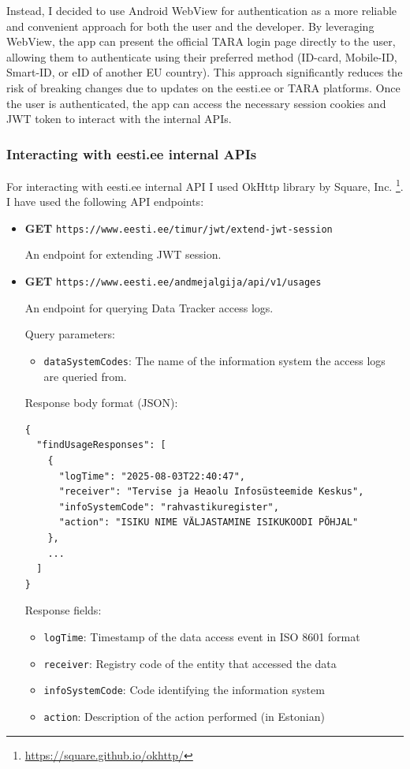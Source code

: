 Instead, I decided to use Android WebView for authentication as a more reliable and convenient approach for both the user and the developer. By leveraging WebView, the app can present the official TARA login page directly to the user, allowing them to authenticate using their preferred method (ID-card, Mobile-ID, Smart-ID, or eID of another EU country). This approach significantly reduces the risk of breaking changes due to updates on the eesti.ee or TARA platforms. Once the user is authenticated, the app can access the necessary session cookies and JWT token to interact with the internal APIs.

\subsubsection{Interacting with eesti.ee internal APIs}
For interacting with eesti.ee internal API I used OkHttp library by Square, Inc. \footnote{\url{https://square.github.io/okhttp/}}. I have used the following API endpoints:

\begin{itemize}
    \item \textbf{GET} \texttt{https://www.eesti.ee/timur/jwt/extend-jwt-session}
    
    An endpoint for extending JWT session.
    
    \item \textbf{GET} \texttt{https://www.eesti.ee/andmejalgija/api/v1/usages}
    
    An endpoint for querying Data Tracker access logs.
    
    Query parameters:
    \begin{itemize}
        \item \texttt{dataSystemCodes}: The name of the information system the access logs are queried from.
    \end{itemize}
    
    \samepage
    Response body format (JSON):
    \begin{small}
    \begin{verbatim}
{
  "findUsageResponses": [
    {
      "logTime": "2025-08-03T22:40:47",
      "receiver": "Tervise ja Heaolu Infosüsteemide Keskus",
      "infoSystemCode": "rahvastikuregister",
      "action": "ISIKU NIME VÄLJASTAMINE ISIKUKOODI PÕHJAL"
    },
    ...
  ]
}
    \end{verbatim}
    \end{small}
    
    Response fields:
    \begin{itemize}
        \item \texttt{logTime}: Timestamp of the data access event in ISO 8601 format
        \item \texttt{receiver}: Registry code of the entity that accessed the data
        \item \texttt{infoSystemCode}: Code identifying the information system
        \item \texttt{action}: Description of the action performed (in Estonian)
    \end{itemize}
\end{itemize}

